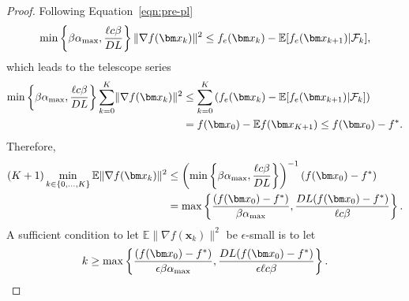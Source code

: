 \documentclass[10pt]{article} %
\numberwithin{equation}{section}
\theoremstyle{plain}
\theoremstyle{definition}
\newcommand{\<}{\langle}
\renewcommand{\>}{\rangle}
\renewcommand{\(}{\left(}
\renewcommand{\)}{\right)}
\renewcommand{\[}{\left[}
\renewcommand{\]}{\right]}
\newcommand{\alphaMax}{\alpha_\textup{max}}
\newcommand{\Lip}{L}
\begin{document}
\begin{proof}
Following Equation~\eqref{eqn:pre-pl} 
\begin{equation}
\min\left\{\beta \alphaMax,\frac{\ell c\beta}{D\Lip}\right\}\lVert \nabla f(\bm x_k)\rVert^2 \leq f_e(\bm x_k) - \mathbb{E}[f_e(\bm x_{k+1})\vert\mathcal{F}_k],
\end{equation}
which leads to the telescope series
\begin{equation}
\begin{aligned}
\min\left\{\beta \alphaMax,\frac{\ell c\beta}{D\Lip}\right\}\sum_{k=0}^K\lVert \nabla f(\bm x_k)\rVert^2
&\leq \sum_{k=0}^K \left(f_e(\bm x_k) - \mathbb{E}[f_e(\bm x_{k+1})\vert\mathcal{F}_k]\right)\\
&= f(\bm x_0) - \mathbb{E}f(\bm x_{K+1})\leq f(\bm x_0) - f^*.
\end{aligned}
\end{equation}
Therefore, 
\begin{equation}
\begin{aligned}
(K+1)\min_{k\in\{0,\dots,K\}}\mathbb{E}\lVert \nabla f(\bm x_k)\rVert^2 &\leq \left(\min\left\{\beta \alphaMax,\frac{\ell c\beta}{D\Lip}\right\}\right)^{-1}(f(\bm x_0) - f^*)\\
&= \max\left\{\frac{(f(\bm x_0) - f^*)}{\beta \alphaMax}, \frac{D\Lip (f(\bm x_0) - f^*)}{\ell c\beta}\right\}.
\end{aligned}
\end{equation}
A sufficient condition to let $\mathbb{E}\lVert\nabla f(\bm x_k)\rVert^2$ be $\epsilon$-small is to let
\begin{equation}
k \geq \max\left\{\frac{(f(\bm x_0) - f^*)}{\epsilon\beta \alphaMax}, \frac{D\Lip (f(\bm x_0) - f^*)}{\epsilon\ell c\beta}\right\}.
\end{equation}
\end{proof}
\end{document}
